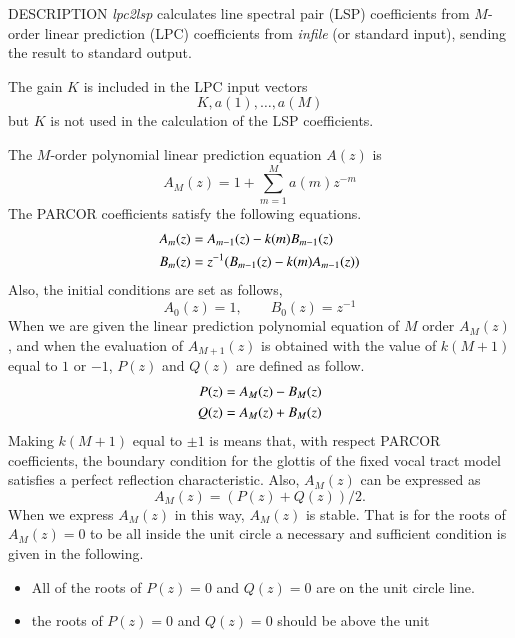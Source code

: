 \begin{qsection}{DESCRIPTION}
{\em lpc2lsp} calculates line spectral pair (LSP) coefficients 
from $M$-order linear prediction (LPC) coefficients 
from {\em infile} (or standard input),
sending the result to standard output.

The gain $K$ is included in the LPC input vectors
\begin{displaymath}
  K, a(1), \dots, a(M)
\end{displaymath}
but $K$ is not used in the calculation of the LSP coefficients.

The $M$-order polynomial linear prediction equation $A(z)$ is
\begin{displaymath}
  A_M(z) = 1 + \sum_{m=1}^M a(m) z^{-m}
\end{displaymath}
The PARCOR coefficients satisfy the following equations.
\begin{align}
  A_m(z) &= A_{m-1}(z) - k(m) B_{m-1}(z) \notag \\
  B_m(z) &= z^{-1} (B_{m-1}(z) - k(m) A_{m-1}(z)) \notag
\end{align}
Also, the initial conditions are set as follows,
\begin{displaymath}
  A_0(z) = 1, \qquad B_0(z) = z^{-1}
\end{displaymath}
When we are given the linear prediction polynomial equation
of $M$ order $A_M(z)$, and when the evaluation of $A_{M+1}(z)$
is obtained with the value of $k(M+1)$ equal to $1$ or $-1$, 
$P(z)$ and $Q(z)$ are defined as follow.
\begin{align}
  P(z) &= A_M(z) - B_M(z) \notag \\
  Q(z) &= A_M(z) + B_M(z) \notag
\end{align}
Making $k(M+1)$ equal to $\pm 1$ is means that,
with respect PARCOR coefficients,
the boundary condition for the glottis of the fixed vocal tract model
satisfies a perfect reflection characteristic.
Also, $A_M(z)$ can be expressed as
\begin{displaymath}
  A_M(z) = ( P(z) + Q(z) ) / 2.
\end{displaymath}
When we express $A_M(z)$ in this way,
$A_M(z)$ is stable.
That is for the roots of $A_M(z)=0$ to be all inside
the unit circle a necessary and sufficient condition is given
in the following.
\begin{itemize}
\item All of the roots of $P(z)=0$ and $Q(z)=0$ are on the unit circle
      line.
\item the roots of $P(z)=0$ and $Q(z)=0$ should be above the unit

\end{itemize}
\end{qsection}
